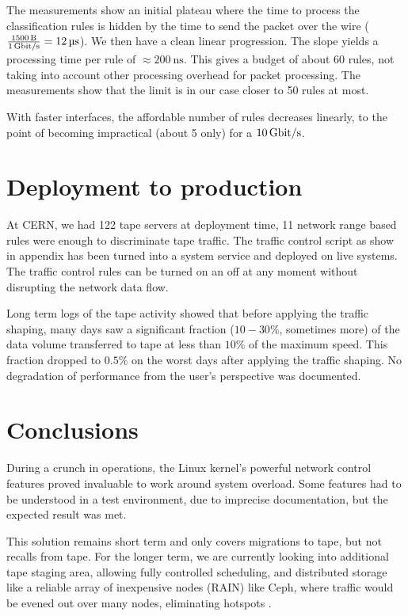 \documentclass[a4paper]{jpconf}
\begin{document}
The measurements show an initial plateau where the time to process the classification rules is hidden by the time to send the packet over the wire ($\frac{\SI{1500}{\byte}}{\SI[per-mode=symbol]{1}{\giga\bit\per\second}}=\SI{12}{\micro\second}$). We then have a clean linear progression. The slope yields a processing time per rule of $\approx\SI{200}{\nano\second}$. This gives a budget of about 60 rules, not taking into account other processing overhead for packet processing. The measurements show that the limit is in our case closer to 50 rules at most.

With faster interfaces, the affordable number of rules decreases linearly, to the point of becoming impractical (about 5 only) for a $\SI[per-mode=symbol]{10}{\giga\bit\per\second}$.

\section{Deployment to production}
At CERN, we had 122 tape servers at deployment time, 11 network range based rules were enough to discriminate tape traffic. The traffic control script as show in appendix has been turned into a system service and deployed on live systems. The traffic control rules can be turned on an off at any moment without disrupting the network data flow.

Long term logs of the tape activity showed that before applying the traffic shaping, many days saw a significant fraction ($10-30\%$, sometimes more) of the data volume transferred to tape at less than $10\%$ of the maximum speed. This fraction dropped to $0.5\%$ on the worst days after applying the traffic shaping. No degradation of performance from the user's perspective was documented.

\section{Conclusions}
During a crunch in operations, the Linux kernel's powerful network control features proved invaluable to work around system overload. Some features had to be understood in a test environment, due to imprecise documentation, but the expected result was met.

This solution remains short term and only covers migrations to tape, but not recalls from tape. For the longer term, we are currently looking into additional tape staging area, allowing fully controlled scheduling, and distributed storage like a reliable array of inexpensive nodes (RAIN) like Ceph, where traffic would be evened out over many nodes, eliminating hotspots \cite{Ceph}.
\end{document}
